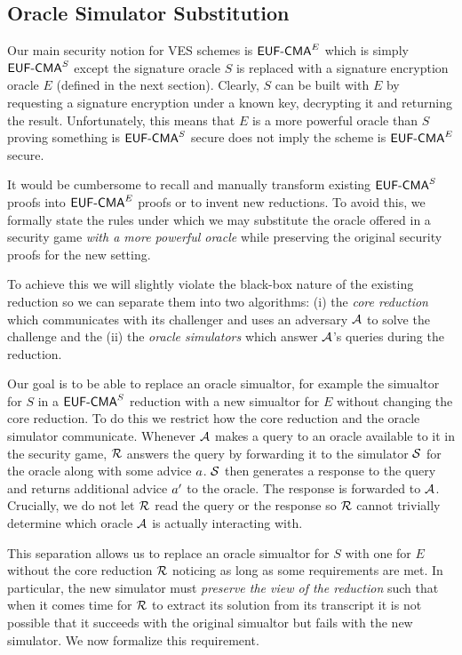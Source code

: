\subsection{Oracle Simulator Substitution}


Our main security notion for VES schemes is $\textsf{EUF-CMA}^E$ which is simply $\textsf{EUF-CMA}^S$ except the signature oracle $S$ is replaced with a signature encryption oracle $E$ (defined in the next section).
Clearly, $S$ can be built with $E$ by requesting a signature encryption under a known key, decrypting it and returning the result.
Unfortunately, this means that $E$ is a more powerful oracle than $S$ proving something is $\textsf{EUF-CMA}^S$ secure does not imply the scheme is $\textsf{EUF-CMA}^E$ secure.

It would be cumbersome to recall and manually transform existing $\textsf{EUF-CMA}^S$ proofs into $\textsf{EUF-CMA}^E$ proofs or to invent new reductions.
To avoid this, we formally state the rules under which we may substitute the oracle offered in a security game \emph{with a more powerful oracle} while preserving the original security proofs for the new setting.

To achieve this we will slightly violate the black-box nature of the existing reduction so we can separate them into two algorithms:
(i) the \emph{core reduction} which communicates with its challenger and uses an adversary $\mathcal{A}$ to solve the challenge and the
(ii) the \emph{oracle simulators} which answer $\mathcal{A}$'s queries during the reduction.

Our goal is to be able to replace an oracle simualtor, for example the simualtor for $S$ in a $\textsf{EUF-CMA}^S$ reduction with a new simualtor for $E$ without changing the core reduction.
To do this we restrict how the core reduction and the oracle simulator communicate.
Whenever $\mathcal{A}$ makes a query to an oracle available to it in the security game, $\mathcal{R}$ answers the query by forwarding it to the simulator $\mathcal{S}$ for the oracle along with some advice $a$.
$\mathcal{S}$ then generates a response to the query and returns additional advice $a'$ to the oracle.
The response is forwarded to $\mathcal{A}$.
Crucially, we do not let $\mathcal{R}$ read the query or the response so $\mathcal{R}$ cannot trivially determine which oracle $\mathcal{A}$ is actually interacting with.

This separation allows us to replace an oracle simualtor for $S$ with one for $E$ without the core reduction $\mathcal{R}$ noticing as long as some requirements are met.
In particular, the new simulator must \emph{preserve the view of the reduction} such that when it comes time for $\mathcal{R}$ to extract its solution from its transcript it is not possible that it succeeds with the original simualtor but fails with the new simulator. We now formalize this requirement.

